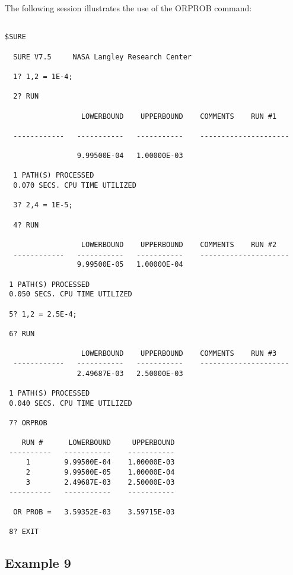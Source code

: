      The following session illustrates the use of the {\isf ORPROB} command:
\begin{verbatim}

$SURE 

  SURE V7.5     NASA Langley Research Center

  1? 1,2 = 1E-4;

  2? RUN

                  LOWERBOUND    UPPERBOUND    COMMENTS    RUN #1

  ------------   -----------   -----------    ---------------------

                 9.99500E-04   1.00000E-03

  1 PATH(S) PROCESSED
  0.070 SECS. CPU TIME UTILIZED

  3? 2,4 = 1E-5;

  4? RUN

                  LOWERBOUND    UPPERBOUND    COMMENTS    RUN #2
  ------------   -----------   -----------    ---------------------
                 9.99500E-05   1.00000E-04

 1 PATH(S) PROCESSED
 0.050 SECS. CPU TIME UTILIZED

 5? 1,2 = 2.5E-4; 

 6? RUN

                  LOWERBOUND    UPPERBOUND    COMMENTS    RUN #3
  ------------   -----------   -----------    ---------------------
                 2.49687E-03   2.50000E-03

 1 PATH(S) PROCESSED
 0.040 SECS. CPU TIME UTILIZED

 7? ORPROB

    RUN #      LOWERBOUND     UPPERBOUND
 ----------   -----------    -----------
     1        9.99500E-04    1.00000E-03
     2        9.99500E-05    1.00000E-04
     3        2.49687E-03    2.50000E-03
 ----------   -----------    -----------

  OR PROB =   3.59352E-03    3.59715E-03

 8? EXIT
\end{verbatim}

\subsection{Example 9 }


